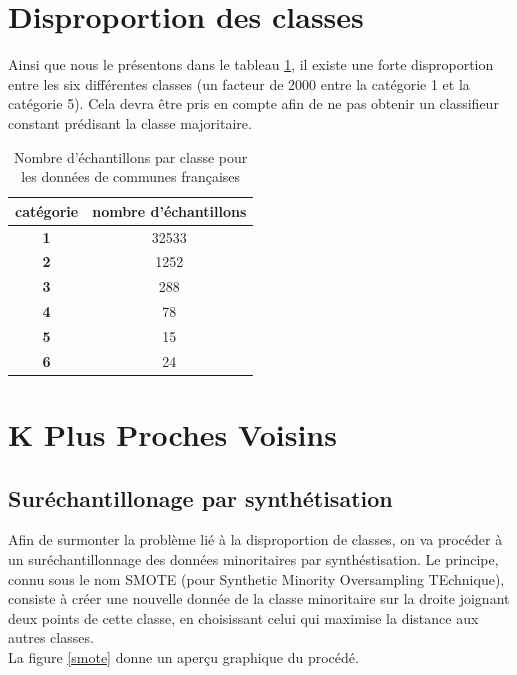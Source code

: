 \documentclass{book}
\begin{document}
\section{Disproportion des classes}
Ainsi que nous le présentons dans le tableau \ref{imbalanced}, il existe une forte disproportion entre les six différentes classes (un facteur de 2000 entre la catégorie 1 et la catégorie 5). 
Cela devra être pris en compte afin de ne pas obtenir un classifieur constant prédisant la classe majoritaire.

\begin{table}[H]
\begin{center}
\begin{adjustbox}{max width=\textwidth}
{
\begin{tabular}{|c|c|}
   \hline
  catégorie & nombre d'échantillons\\
  \hline
  \textbf{1} & 32533\\
  \hline
  \textbf{2} & 1252\\
  \hline
  \textbf{3} & 288\\
  \hline
  \textbf{4} & 78\\
  \hline
  \textbf{5} & 15\\
  \hline
  \textbf{6} & 24 \\
  \hline
\end{tabular}
}
\end{adjustbox}
\end{center}
\caption{Nombre d'échantillons par classe pour les données de communes françaises}
\label{imbalanced}
\end{table}

\section{K Plus Proches Voisins}

\subsection{Suréchantillonage par synthétisation}
Afin de surmonter la problème lié à la disproportion de classes, on va procéder à un suréchantillonnage des données minoritaires par synthéstisation. Le principe, connu sous le nom SMOTE \cite{smote} (pour 
Synthetic Minority Oversampling TEchnique), consiste à créer une nouvelle donnée de la classe minoritaire sur la droite joignant deux points de cette classe, en choisissant celui qui maximise la distance aux autres classes.\\
La figure \ref{smote} donne un aperçu graphique du procédé.
\end{document}
